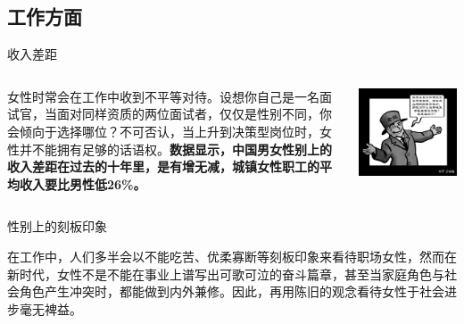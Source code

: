 \subsection{工作方面}
\begin{frame}{收入差距}
    \begin{columns}
        \begin{column}{0.3\textwidth}
            \begin{block}{}
                女性时常会在工作中收到不平等对待。设想你自己是一名面试官，当面对同样资质的两位面试者，仅仅是性别不同，你会倾向于选择哪位？不可否认，当上升到决策型岗位时，女性并不能拥有足够的话语权。\textbf{数据显示，中国男女性别上的收入差距在过去的十年里，是有增无减，城镇女性职工的平均收入要比男性低26\%。}
            \end{block}
        \end{column}
        \begin{column}{0.6\textwidth}
            \begin{center}
                \includegraphics[width=.81\textwidth]{../docs/img/3-1.jpg}
            \end{center}
        \end{column}
    \end{columns}
\end{frame}

\begin{frame}{性别上的刻板印象}
    \begin{block}{}
        在工作中，人们多半会以不能吃苦、优柔寡断等刻板印象来看待职场女性，然而在新时代，女性不是不能在事业上谱写出可歌可泣的奋斗篇章，甚至当家庭角色与社会角色产生冲突时，都能做到内外兼修。因此，再用陈旧的观念看待女性于社会进步毫无裨益。
    \end{block}
\end{frame}



